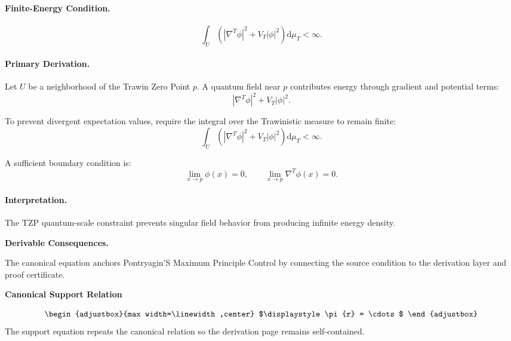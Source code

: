 \paragraph{Finite-Energy Condition.}
\begin{equation}
\int_U
\left(
|\nabla^T\phi|^2
+
V_T|\phi|^2
\right)
\mathrm{d}\mu_T
<\infty .
\end{equation}

\paragraph{Primary Derivation.}
Let $U$ be a neighborhood of the Trawin Zero Point $p$.  
A quantum field near $p$ contributes energy through gradient and potential terms:
\begin{equation}
|\nabla^T\phi|^2
+
V_T|\phi|^2 .
\end{equation}

To prevent divergent expectation values, require the integral over the Trawinistic measure to remain finite:
\begin{equation}
\int_U
\left(
|\nabla^T\phi|^2
+
V_T|\phi|^2
\right)
\mathrm{d}\mu_T
<\infty .
\end{equation}

A sufficient boundary condition is:
\begin{equation}
\boxed{
\lim_{x\to p}\phi(x)=0,
\qquad
\lim_{x\to p}\nabla^T\phi(x)=0 .
}
\end{equation}

\paragraph{Interpretation.}
The TZP quantum-scale constraint prevents singular field behavior from producing infinite energy density.

\par\vspace{0.35em}
\noindent\textbf{Derivable Consequences.}\quad
\begingroup
\footnotesize
\raggedright
The canonical equation anchors Pontryagin'S Maximum Principle Control by connecting the source condition to the derivation layer and proof certificate.
\par\endgroup

\noindent\textbf{Canonical Support Relation}\par
\[
\begin{adjustbox}{max width=\linewidth,center}
$\displaystyle
\pi {r} = \cdots
$
\end{adjustbox}
\]
\noindent The support equation repeats the canonical relation so the derivation page remains self-contained.\par

